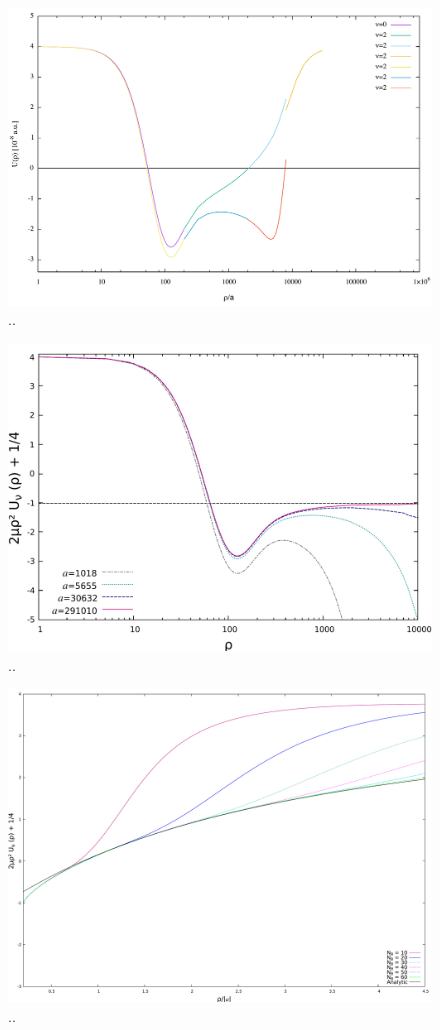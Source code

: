 \begin{figure}
	\includegraphics[width=\linewidth]{diff.pdf}
	\caption{..}
	\label{fig:res_4}
\end{figure}

\begin{figure}
	\includegraphics[width=\linewidth]{plotpos.pdf}
	\caption{..}
	\label{fig:res_5}
\end{figure}

\begin{figure}
	\includegraphics[width=\linewidth]{sn2385.pdf}
	\caption{..}
	\label{fig:res_6}
\end{figure}

